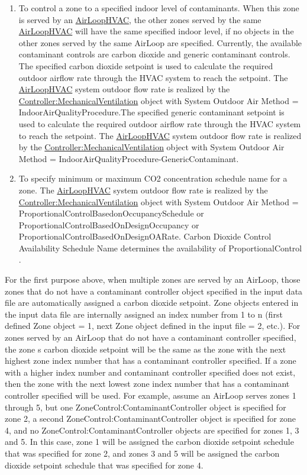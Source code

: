 \begin{enumerate}
\def\labelenumi{\arabic{enumi})}
\item
  To control a zone to a specified indoor level of contaminants. When this zone is served by an \hyperref[airloophvac]{AirLoopHVAC}, the other zones served by the same \hyperref[airloophvac]{AirLoopHVAC} will have the same specified indoor level, if no objects in the other zones served by the same AirLoop are specified. Currently, the available contaminant controls are carbon dioxide and generic contaminant controls. The specified carbon dioxide setpoint is used to calculate the required outdoor airflow rate through the HVAC system to reach the setpoint. The \hyperref[airloophvac]{AirLoopHVAC} system outdoor flow rate is realized by the \hyperref[controllermechanicalventilation]{Controller:MechanicalVentilation} object with System Outdoor Air Method = IndoorAirQualityProcedure.The specified generic contaminant setpoint is used to calculate the required outdoor airflow rate through the HVAC system to reach the setpoint. The \hyperref[airloophvac]{AirLoopHVAC} system outdoor flow rate is realized by the \hyperref[controllermechanicalventilation]{Controller:MechanicalVentilation} object with System Outdoor Air Method = IndoorAirQualityProcedure-GenericContaminant.
\item
  To specify minimum or maximum CO2 concentration schedule name for a zone. The \hyperref[airloophvac]{AirLoopHVAC} system outdoor flow rate is realized by the \hyperref[controllermechanicalventilation]{Controller:MechanicalVentilation} object with System Outdoor Air Method = ProportionalControlBasedonOccupancySchedule or ProportionalControlBasedOnDesignOccupancy or ProportionalControlBasedOnDesignOARate. Carbon Dioxide Control Availability Schedule Name determines the availability of ProportionalControl .
\end{enumerate}

For the first purpose above, when multiple zones are served by an AirLoop, those zones that do not have a contaminant controller object specified in the input data file are automatically assigned a carbon dioxide setpoint. Zone objects entered in the input data file are internally assigned an index number from 1 to n (first defined Zone object = 1, next Zone object defined in the input file = 2, etc.). For zones served by an AirLoop that do not have a contaminant controller specified, the zone s carbon dioxide setpoint will be the same as the zone with the next highest zone index number that has a contaminant controller specified. If a zone with a higher index number and contaminant controller specified does not exist, then the zone with the next lowest zone index number that has a contaminant controller specified will be used. For example, assume an AirLoop serves zones 1 through 5, but one ZoneControl:ContaminantController object is specified for zone 2, a second ZoneControl:ContaminantController object is specified for zone 4, and no ZoneControl:ContaminantController objects are specified for zones 1, 3 and 5. In this case, zone 1 will be assigned the carbon dioxide setpoint schedule that was specified for zone 2, and zones 3 and 5 will be assigned the carbon dioxide setpoint schedule that was specified for zone 4.

